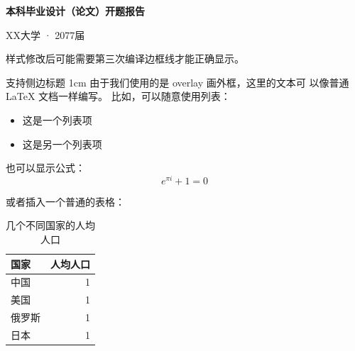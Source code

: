 \documentclass[12pt,a4paper]{ctexart}
\begin{document}
\vspace{0.5em}
{\centering\bfseries\LARGE 本科毕业设计（论文）开题报告 \par}
\vspace{0.3em}
{\centering\large XX大学 · 2077届 \par}
\begin{TableFrame}






  样式修改后可能需要第三次编译边框线才能正确显示。

  \vspace{6cm} %


  \begin{TableSidebar}{
      \centering
      支持侧边标题
    }{1cm} %
    由于我们使用的是 overlay 画外框，这里的文本可
    以像普通 LaTeX 文档一样编写。
    比如，可以随意使用列表：
    \begin{itemize}
      \item 这是一个列表项
      \item 这是另一个列表项
    \end{itemize}

    也可以显示公式：
    \begin{equation}
      e^{\pi i} + 1 = 0
    \end{equation}

    或者插入一个普通的表格：

    \begin{table}[H] %
      \caption{几个不同国家的人均人口}
      \begin{center}
        \begin{tabular}[c]{|l|r|}
          \hline
          国家 & 人均人口 \\
          \hline
          中国 & 1 \\
          美国 & 1 \\
          俄罗斯 & 1 \\
          日本 & 1 \\
          \hline
        \end{tabular}
      \end{center}
    \end{table}


\end{TableSidebar}
\end{TableFrame}
\end{document}
